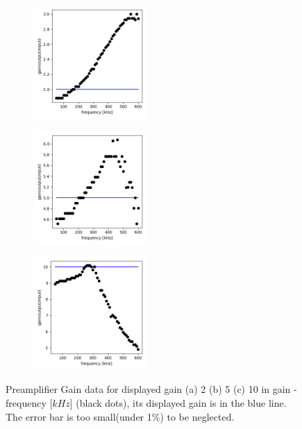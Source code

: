 \documentclass{article}
\begin{document}
 \begin{figure}[ht]
    \begin{subfigure}[b]{4.3cm}
        \centering
        \includegraphics[width=4.3cm]{../results/preamplifier_gain_freq_plot(gain2).png}
        \caption{}
    \end{subfigure}
    \hfill
    \begin{subfigure}[b]{4.3cm}
      \centering
      \includegraphics[width=4.3cm]{../results/preamplifier_gain_freq_plot(gain5).png}
      \caption{}
  \end{subfigure}
  \hfill
  \begin{subfigure}[b]{4.3cm}
    \centering
    \includegraphics[width=4.3cm]{../results/preamplifier_gain_freq_plot(gain10).png}
    \caption{}
  \end{subfigure}
  \hfill
    \caption{Preamplifier Gain data for displayed gain (a) 2 (b) 5 (c) 10 in gain - frequency [$kHz$] (black dots),
     its displayed gain is in the blue line. The error bar is too small(under 1\%) to be neglected.
     }
    \label{fig: preamplifier_gain_plot}
  \end{figure}
\end{document}
